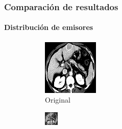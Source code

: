 \documentclass[11pt]{beamer}
\begin{document}
\begin{frame}
\frametitle{Comparación de resultados}
\framesubtitle{Distribución de emisores}

\begin{figure}[H]
    \centering
    \begin{subfigure}[h]{0.3\textwidth} 
        \includegraphics[width=\textwidth]{img/tomo.png}
        \caption{Original}
        \label{fig:original1}
    \end{subfigure}%
    \hfill
    \begin{subfigure}[h]{0.30\textwidth}
        \includegraphics[width=\textwidth]{img/tomo_granu_4.png}

\end{subfigure}
\end{figure}
\end{frame}
\end{document}
